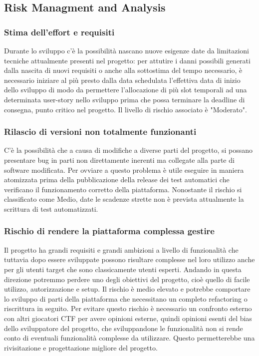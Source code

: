 \documentclass[11pt]{article}
\begin{document}
\subsection{Risk Managment and Analysis}
\subsubsection{Stima dell'effort e requisiti}
Durante lo sviluppo c'è la possibilità nascano nuove esigenze date da limitazioni tecniche attualmente presenti nel progetto: per attutire i danni possibili generati dalla nascita di nuovi requisiti o anche alla sottostima del tempo necessario, è necessario iniziare al più presto dalla data schedulata l'effettiva data di inizio dello sviluppo di modo da permettere l'allocazione di più slot temporali ad una determinata user-story nello sviluppo prima che possa terminare la deadline di consegna, punto critico nel progetto. Il livello di rischio associato è "Moderato".
\subsubsection{Rilascio di versioni non totalmente funzionanti}
C'è la possibilità che a causa di modifiche a diverse parti del progetto, si possano presentare bug in parti non direttamente inerenti ma collegate alla parte di software modificata. Per ovviare a questo problema è utile eseguire in maniera atomizzata prima della pubblicazione della release dei test automatici che verificano il funzionamento corretto della piattaforma. Nonostante il rischio si classificato come Medio, date le scadenze strette non è prevista attualmente la scrittura di test automatizzati.
\subsubsection{Rischio di rendere la piattaforma complessa gestire}
Il progetto ha grandi requisiti e grandi ambizioni a livello di funzionalità che tuttavia dopo essere sviluppate possono risultare complesse nel loro utilizzo anche per gli utenti target che sono classicamente utenti esperti. Andando in questa direzione potremmo perdere uno degli obiettivi del progetto, cioè quello di facile utilizzo, autorizzazione e setup. Il rischio è medio elevato e potrebbe comportare lo sviluppo di parti della piattaforma che necessitano un completo refactoring o riscrittura in seguito. Per evitare questo rischio è necessario un confronto esterno con altri giocatori CTF per avere opinioni esterne, quindi opinioni esenti del bias dello sviluppatore del progetto, che sviluppandone le funzionalità non si rende conto di eventuali funzionalità complesse da utilizzare. Questo permetterebbe una rivisitazione e progettazione migliore del progetto.
\end{document}
